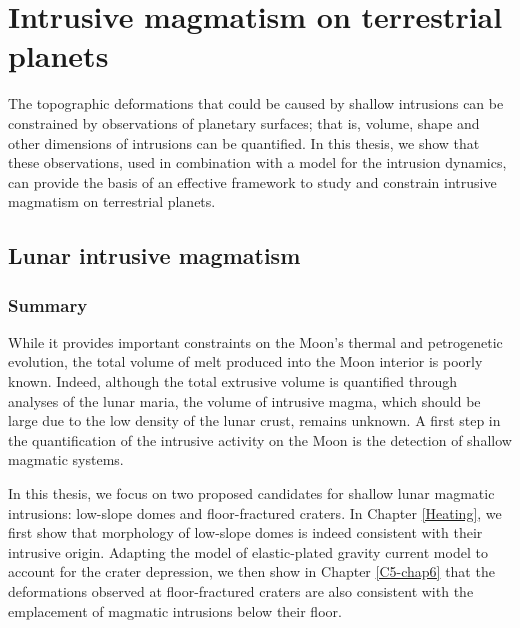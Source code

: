 \chapter{Intrusive magmatism on terrestrial planets}
\label{chap8}
\minitoc

The  topographic   deformations  that  could  be   caused  by  shallow
intrusions can  be constrained by observations  of planetary surfaces;
that  is, volume,  shape and  other  dimensions of  intrusions can  be
quantified. In this  thesis, we show that these  observations, used in
combination with a  model for the intrusion dynamics,  can provide the
basis  of an  effective  framework to  study  and constrain  intrusive
magmatism on terrestrial planets.

\section{Lunar intrusive magmatism}
\label{sec:terr-intr-magm}

\subsection{Summary}
\label{sec:summary}

While  it provides  important constraints  on the  Moon's thermal  and
petrogenetic evolution,  the total  volume of  melt produced  into the
Moon interior is  poorly known.  Indeed, although  the total extrusive
volume is quantified  through analyses of the lunar  maria, the volume
of intrusive  magma, which should be  large due to the  low density of
the lunar crust,  remains unknown. A first step  in the quantification
of the  intrusive activity  on the  Moon is  the detection  of shallow
magmatic systems.

In this thesis, we focus on  two proposed candidates for shallow lunar
magmatic intrusions:  low-slope domes and floor-fractured  craters. In
Chapter  \ref{Heating}, we  first  show that  morphology of  low-slope
domes is indeed consistent with  their intrusive origin.  Adapting the
model  of elastic-plated  gravity  current model  to  account for  the
crater depression,  we then  show in  Chapter \ref{C5-chap6}  that the
deformations observed  at floor-fractured craters are  also consistent
with the emplacement of magmatic intrusions below their floor.

